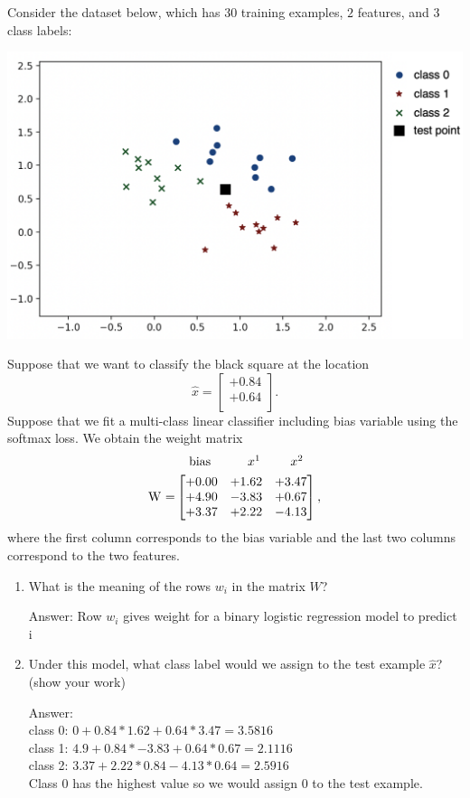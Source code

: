 \documentclass{article}
\def\ans#1{\par\gre{Answer: #1}}
\def\blu#1{{\color{blu}#1}}
\def\gre#1{{\color{gre}#1}}
\begin{document}
Consider the dataset below, which has $30$ training examples, $2$ features, and $3$ class labels:\\
\begin{center}\includegraphics[scale=0.3]{figs/softmaxData.png}\end{center}
Suppose that we want to classify the black square at the location
\[
\hat{x} = \begin{bmatrix}+0.84 \\ +0.64\\ \end{bmatrix}.
\]
Suppose that we fit a multi-class linear classifier including bias variable using the softmax loss. We obtain the weight matrix
\[
\raisebox{-0.28cm}{W =}
\begin{aligned}
            &
            \begin{matrix*}[c]
            \mkern20mu\textrm{bias} & \mkern35mu x^{1} & \mkern25mu x^{2}
            \end{matrix*}
            \\
            &
            \begin{bmatrix*}[r]
                +0.00 & +1.62 & +3.47\\
                +4.90 & -3.83 & +0.67\\
                +3.37 & +2.22 & -4.13 
            \end{bmatrix*},
\end{aligned}
\]
where the first column corresponds to the bias variable and the last two columns correspond to the two features.
\blu{
\begin{enumerate}
\item What is the meaning of the rows $w_i$ in the matrix $W$?
\ans{Row $w_i$ gives weight for a binary logistic regression model to predict i}
\item Under this model, what class label would we assign to the test example $\hat{x}$? (show your work)
\ans{ \\
class 0: $0+0.84*1.62+0.64*3.47=3.5816$ \\
class 1: $4.9+0.84*-3.83+0.64*0.67=2.1116$ \\
class 2: $3.37+2.22*0.84-4.13*0.64=2.5916$ \\
Class 0 has the highest value so we would assign 0 to the test example.
}
\end{enumerate}}
\end{document}
